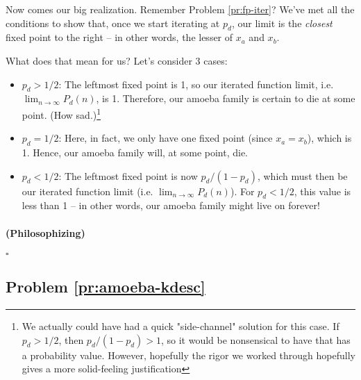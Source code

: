 Now comes our big realization. Remember Problem \ref{pr:fp-iter}? We've met all the conditions to show that, once we start iterating at $p_d$, our limit is the \emph{closest} fixed point to the right -- in other words, the lesser of $x_a$ and $x_b$.

What does that mean for us? Let's consider 3 cases:

\begin{itemize}
\item $p_d > 1/2$: The leftmost fixed point is 1, so our iterated function limit, i.e. $\lim_{n \rightarrow \infty} P_d(n)$, is 1. Therefore, our amoeba family is certain to die at some point. (How sad.)\footnote{We actually could have had a quick "side-channel" solution for this case. If $p_d > 1/2$, then $p_d / (1 - p_d) > 1$, so it would be nonsensical to have that has a probability value. However, hopefully the rigor we worked through hopefully gives a more solid-feeling justification}
\item $p_d = 1/2$: Here, in fact, we only have one fixed point (since $x_a = x_b$), which is 1. Hence, our amoeba family will, at some point, die.
\item $p_d < 1/2$: The leftmost fixed point is now $p_d / (1 - p_d)$, which must then be our iterated function limit (i.e. $\lim_{n \rightarrow \infty} P_d(n)$). For $p_d < 1/2$, this value is less than 1 -- in other words, our amoeba family might live on forever!
\end{itemize}


\paragraph{(Philosophizing)}





$\square$


\subsection{Problem \ref{pr:amoeba-kdesc}}


